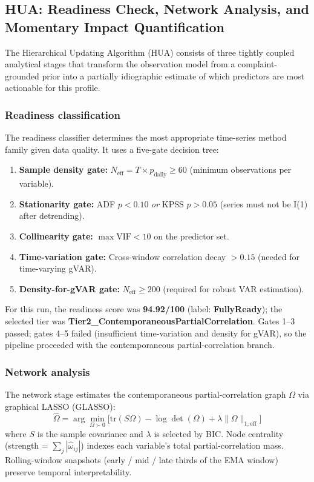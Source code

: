 \documentclass[11pt,a4paper]{article}
\newcommand{\ReadinessScore}{94.92}
\newcommand{\ReadinessTier}{Tier2\_ContemporaneousPartialCorrelation}
\begin{document}
\subsection{HUA: Readiness Check, Network Analysis, and Momentary Impact Quantification}
\label{sec:hua}

The Hierarchical Updating Algorithm (HUA) consists of three tightly coupled analytical stages that transform the observation model from a complaint-grounded prior into a partially idiographic estimate of which predictors are most actionable for this profile.

\subsubsection*{Readiness classification}
The readiness classifier determines the most appropriate time-series method family given data quality. It uses a five-gate decision tree:
\begin{enumerate}[leftmargin=1.8em,topsep=2pt,itemsep=1pt]
  \item \textbf{Sample density gate:} $N_{\text{eff}} = T \times p_{\text{daily}} \geq 60$ (minimum observations per variable).
  \item \textbf{Stationarity gate:} ADF $p < 0.10$ \emph{or} KPSS $p > 0.05$ (series must not be I(1) after detrending).
  \item \textbf{Collinearity gate:} $\max\text{VIF} < 10$ on the predictor set.
  \item \textbf{Time-variation gate:} Cross-window correlation decay $> 0.15$ (needed for time-varying gVAR).
  \item \textbf{Density-for-gVAR gate:} $N_{\text{eff}} \geq 200$ (required for robust VAR estimation).
\end{enumerate}
For this run, the readiness score was \textbf{\ReadinessScore/100} (label: \textbf{FullyReady}); the selected tier was \textbf{\ReadinessTier}. Gates 1--3 passed; gates 4--5 failed (insufficient time-variation and density for gVAR), so the pipeline proceeded with the contemporaneous partial-correlation branch.

\subsubsection*{Network analysis}
The network stage estimates the contemporaneous partial-correlation graph $\Omega$ via graphical LASSO (GLASSO):
\[
  \hat{\Omega} = \arg\min_{\Omega \succ 0} \bigl[\mathrm{tr}(S\Omega) - \log\det(\Omega) + \lambda\|\Omega\|_{1,\text{off}}\bigr]
\]
where $S$ is the sample covariance and $\lambda$ is selected by BIC. Node centrality (strength = $\sum_j |\hat{\omega}_{ij}|$) indexes each variable's total partial-correlation mass. Rolling-window snapshots (early / mid / late thirds of the EMA window) preserve temporal interpretability.
\end{document}
